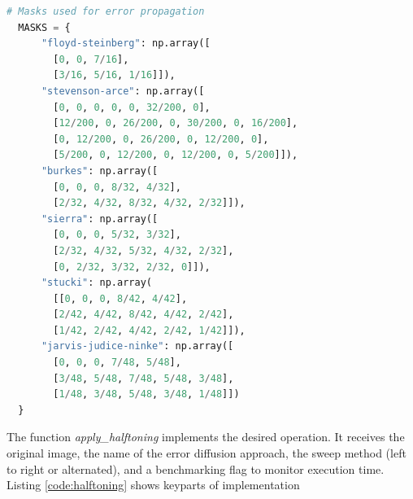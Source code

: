 \documentclass[]{IEEEtran}
\begin{document}
\begin{lstlisting}[language=Python, caption={Masks used for error diffusion}, label={code:masks}]
  # Masks used for error propagation
  MASKS = {
      "floyd-steinberg": np.array([
        [0, 0, 7/16],
        [3/16, 5/16, 1/16]]),
      "stevenson-arce": np.array([
        [0, 0, 0, 0, 0, 32/200, 0],
        [12/200, 0, 26/200, 0, 30/200, 0, 16/200],
        [0, 12/200, 0, 26/200, 0, 12/200, 0],
        [5/200, 0, 12/200, 0, 12/200, 0, 5/200]]),
      "burkes": np.array([
        [0, 0, 0, 8/32, 4/32],
        [2/32, 4/32, 8/32, 4/32, 2/32]]),
      "sierra": np.array([
        [0, 0, 0, 5/32, 3/32],
        [2/32, 4/32, 5/32, 4/32, 2/32],
        [0, 2/32, 3/32, 2/32, 0]]),
      "stucki": np.array(
        [[0, 0, 0, 8/42, 4/42],
        [2/42, 4/42, 8/42, 4/42, 2/42],
        [1/42, 2/42, 4/42, 2/42, 1/42]]),
      "jarvis-judice-ninke": np.array([
        [0, 0, 0, 7/48, 5/48],
        [3/48, 5/48, 7/48, 5/48, 3/48],
        [1/48, 3/48, 5/48, 3/48, 1/48]])
  }
\end{lstlisting}
The function \textit{apply\_halftoning} implements the desired operation. It receives the original image, the name of the error diffusion approach, the sweep method (left to right or alternated), and a benchmarking flag to monitor execution time. Listing \ref{code:halftoning} shows keyparts of implementation
\end{document}

